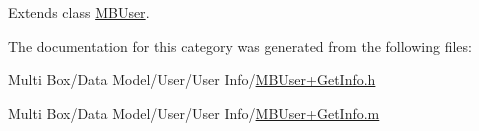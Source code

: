 Extends class \hyperlink{interface_m_b_user_abcc7b52369b86b5d370384bb4c797ce8}{M\-B\-User}.



The documentation for this category was generated from the following files\-:\begin{DoxyCompactItemize}
\item 
Multi Box/\-Data Model/\-User/\-User Info/\hyperlink{_m_b_user_09_get_info_8h}{M\-B\-User+\-Get\-Info.\-h}\item 
Multi Box/\-Data Model/\-User/\-User Info/\hyperlink{_m_b_user_09_get_info_8m}{M\-B\-User+\-Get\-Info.\-m}\end{DoxyCompactItemize}
